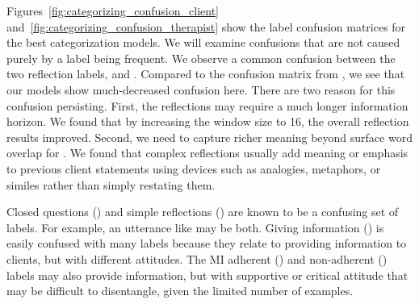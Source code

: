Figures~\ref{fig:categorizing_confusion_client} and~\ref{fig:categorizing_confusion_therapist} show the
label confusion matrices for the best categorization models. We will
examine confusions that are not caused purely by a label being
frequent. We observe a common confusion between
the two reflection labels, \REC and \RES. Compared to the
confusion matrix from \citet{xiao2016behavioral}, we see that our
models show much-decreased confusion here. There are two reason for
this confusion persisting. First, the reflections may require a much
longer information horizon. We found that by increasing the window
size to 16, the overall reflection results improved. Second, we need
to capture richer meaning beyond surface word overlap for
\RES. We found that
complex reflections usually add meaning or emphasis  to
previous client statements using devices such as analogies,
metaphors, or similes rather than simply restating them. %

%
Closed questions (\QUC) and simple reflections (\RES) are known to
be a confusing set of labels. For example, an utterance like
 may be both.
%
Giving information (\GI)
is easily confused with many labels because they relate to providing
information to clients, but with different attitudes. The MI adherent
(\MIA) and non-adherent (\MIN) labels may also provide information,
but with supportive or critical attitude that may be difficult to
disentangle, given the limited number of examples.



